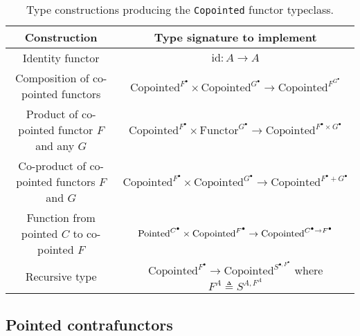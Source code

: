 \begin{table}
\begin{centering}
\begin{tabular}{|c|c|}
\hline 
\textbf{\footnotesize{}Construction} & \textbf{\footnotesize{}Type signature to implement}\tabularnewline
\hline 
\hline 
{\footnotesize{}Identity functor} & {\footnotesize{}$\text{id}:A\rightarrow A$}\tabularnewline
\hline 
{\footnotesize{}Composition of co-pointed functors} & {\footnotesize{}$\text{Copointed}^{F^{\bullet}}\times\text{Copointed}^{G^{\bullet}}\rightarrow\text{Copointed}^{F^{G^{\bullet}}}$}\tabularnewline
\hline 
{\footnotesize{}Product of co-pointed functor $F$ and any $G$} & {\footnotesize{}$\text{Copointed}^{F^{\bullet}}\times\text{Functor}^{G^{\bullet}}\rightarrow\text{Copointed}^{F^{\bullet}\times G^{\bullet}}$}\tabularnewline
\hline 
{\footnotesize{}Co-product of co-pointed functors $F$ and $G$} & {\footnotesize{}$\text{Copointed}^{F^{\bullet}}\times\text{Copointed}^{G^{\bullet}}\rightarrow\text{Copointed}^{F^{\bullet}+G^{\bullet}}$}\tabularnewline
\hline 
{\footnotesize{}Function from pointed $C$ to co-pointed $F$} & {\footnotesize{}$\text{\ensuremath{\text{Pointed}^{C^{\bullet}}}}\times\text{Copointed}^{F^{\bullet}}\rightarrow\text{Copointed}^{C^{\bullet}\rightarrow F^{\bullet}}$}\tabularnewline
\hline 
{\footnotesize{}Recursive type} & {\footnotesize{}$\text{Copointed}^{F^{\bullet}}\rightarrow\text{Copointed}^{S^{\bullet,F^{\bullet}}}$
where $F^{A}\triangleq S^{A,F^{A}}$}\tabularnewline
\hline 
\end{tabular}
\par\end{centering}
\caption{Type constructions producing the \lstinline!Copointed! functor typeclass.\label{tab:Type-constructions-for-copointed-functor}}
\end{table}


\subsection{Pointed contrafunctors\label{subsec:Pointed-contrafunctors}}

